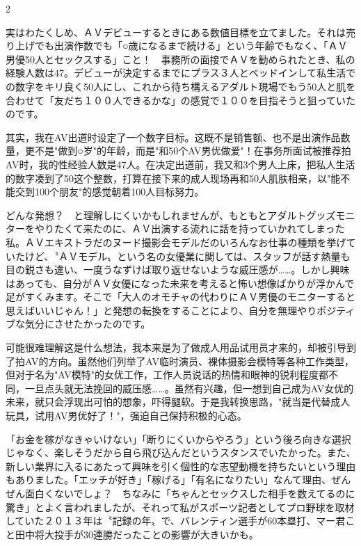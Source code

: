 \documentclass[12pt,UTF8]{ctexbook}
\begin{document}
\begin{paracol}{2}

実はわたくしめ、ＡＶデビューするときにある数値目標を立てました。それは売り上げでも出演作数でも「○歳になるまで続ける」という年齢でもなく、「ＡＶ男優50人とセックスする」こと！　事務所の面接でＡＶを勧められたとき、私の経験人数は47。デビューが決定するまでにプラス３人とベッドインして私生活での数字をキリ良く50人にし、これから待ち構えるアダルト現場でもう50人と肌を合わせて「友だち１００人できるかな」の感覚で１００を目指そうと狙っていたのです。

\switchcolumn

其实，我在AV出道时设定了一个数字目标。这既不是销售额、也不是出演作品数量，更不是"做到○岁"的年龄，而是"和50个AV男优做爱"！在事务所面试被推荐拍AV时，我的性经验人数是47人。在决定出道前，我又和3个男人上床，把私人生活的数字凑到了50这个整数，打算在接下来的成人现场再和50人肌肤相亲，以"能不能交到100个朋友"的感觉朝着100人目标努力。

\switchcolumn*

どんな発想？　と理解しにくいかもしれませんが、もともとアダルトグッズモニターをやりたくて来たのに、ＡＶ出演する流れに話を持っていかれてしまった私。ＡＶエキストラだのヌード撮影会モデルだのいろんなお仕事の種類を挙げていたけど、〝ＡＶモデル〟という名の女優業に関しては、スタッフが話す熱量も目の鋭さも違い、一度うなずけば取り返せないような威圧感が……。しかし興味はあっても、自分がＡＶ女優になった未来を考えると怖い想像ばかりが浮かんで足がすくみます。そこで「大人のオモチャの代わりにＡＶ男優のモニターすると思えばいいじゃん！」と発想の転換をすることにより、自分を無理やりポジティブな気分にさせたかったのです。

\switchcolumn

可能很难理解这是什么想法，我本来是为了做成人用品试用员才来的，却被引导到了拍AV的方向。虽然他们列举了AV临时演员、裸体摄影会模特等各种工作类型，但对于名为"AV模特"的女优工作，工作人员说话的热情和眼神的锐利程度都不同，一旦点头就无法挽回的威压感……。虽然有兴趣，但一想到自己成为AV女优的未来，就只会浮现出可怕的想象，吓得腿软。于是我转换思路，"就当是代替成人玩具，试用AV男优好了！"，强迫自己保持积极的心态。

\switchcolumn*

「お金を稼がなきゃいけない」「断りにくいからやろう」という後ろ向きな選択じゃなく、楽しそうだから自ら飛び込んだというスタンスでいたかった。また、新しい業界に入るにあたって興味を引く個性的な志望動機を持ちたいという理由もありました。「エッチが好き」「稼げる」「有名になりたい」なんて理由、ぜんぜん面白くないでしょ？　ちなみに「ちゃんとセックスした相手を数えてるのに驚き」とよく言われましたが、それって私がスポーツ記者としてプロ野球を取材していた２０１３年は〝記録の年〟で、バレンティン選手が60本塁打、マー君こと田中将大投手が30連勝だったことの影響が大きいかも。


\end{paracol}
\end{document}
